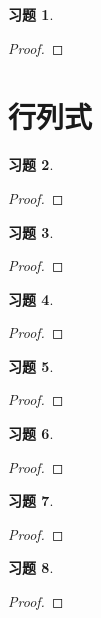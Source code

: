 \documentclass{ctexart}
\newtheorem{problem}{习题}[section]
\begin{document}
\begin{problem}
\end{problem}
\begin{proof}

\end{proof}

\clearpage

\section{行列式}

\begin{problem}
\end{problem}
\begin{proof}

\end{proof}

\begin{problem}
\end{problem}
\begin{proof}

\end{proof}

\begin{problem}
\end{problem}
\begin{proof}

\end{proof}

\begin{problem}
\end{problem}
\begin{proof}

\end{proof}

\begin{problem}
\end{problem}
\begin{proof}

\end{proof}

\setcounter{problem}{6}
\begin{problem}
\end{problem}
\begin{proof}

\end{proof}

\setcounter{problem}{8}
\begin{problem}
\end{problem}
\begin{proof}

\end{proof}
\end{document}

